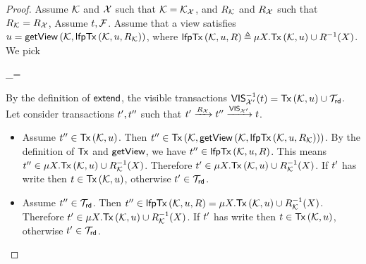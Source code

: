 \begin{proof}
    Assume \( \mathcal{K} \) and \( \mathcal{X} \) such that \( \mathcal{K} = \mathcal{K}_{\mathcal{X}} \), 
    and \( R_{\mathcal{K}} \) and \( R_{\mathcal{X}} \) such that \( R_{\mathcal{K}} = R_{\mathcal{X}} \),
    Assume \(t, \mathcal{F} \).
    Assume that a view satisfies \( \vi = \getView[\mkvs,\lfpTx[\mkvs,\vi,\rel_\mkvs]] \),
    where \( \lfpTx[\mkvs,\vi, \rel] \defeq \mu X . \Tx[\mkvs,\vi] \cup \rel^{-1}(X) \).
    We pick
    \begin{centermultline}
        \txidset_\rd = \lfpTx[\mkvs,\vi,\rel] \setminus \Tx[\mkvs,\vi]
    \end{centermultline}
    By the definition of \( \extend \),  the visible transactions 
    \( \VIS_{\aexec'}^{-1}(\txid) = \Tx[\mkvs, \vi] \cup \txidset_\rd \).
    Let consider transactions \( t', t'' \) such that \( t' \xrightarrow{R_{\mathcal{X}}} t'' \xrightarrow{\mathsf{VIS}_{\mathcal{X}'}} t \).
    \begin{itemize}
        \item Assume \( \txid'' \in \Tx[\mkvs, \vi] \).
        Then \( \txid'' \in \Tx[\mkvs, \getView[\mkvs,\lfpTx[\mkvs,\vi,\rel_\mkvs]]]\).
        By the definition of \( \Tx \) and \( \getView \), we have \(  \txid'' \in \lfpTx[\mkvs,\vi,\rel] \).
        This means \( \txid'' \in \mu X . \Tx[\mkvs,\vi] \cup \rel_{\mkvs}^{-1}(X) \).
        Therefore \( \txid' \in \mu X . \Tx[\mkvs,\vi] \cup \rel_{\mkvs}^{-1}(X) \).
        If \( t' \) has write then \( \txid \in \Tx[\mkvs,\vi] \), otherwise \( t' \in \mathcal{T}_{\mathsf{rd}} \).
        
        \item Assume \( t'' \in \mathcal{T}_{\mathsf{rd}} \).
        Then \( \txid'' \in \lfpTx[\mkvs,\vi,\rel] = \mu X . \Tx[\mkvs,\vi] \cup \rel_{\mkvs}^{-1}(X) \).
        Therefore \( \txid' \in \mu X . \Tx[\mkvs,\vi] \cup \rel_{\mkvs}^{-1}(X) \).
        If \( t' \) has write then \( \txid \in \Tx[\mkvs,\vi] \), otherwise \( t' \in \mathcal{T}_{\mathsf{rd}} \).
    \end{itemize}


\end{proof}
